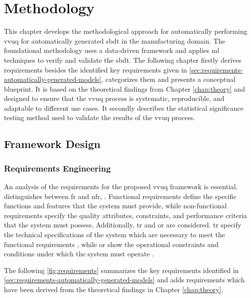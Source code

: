 \chapter{Methodology}
\label{chap:methodology}
This chapter develops the methodological approach for automatically performing \gls{vvuq} for automatically generated \gls{sbdt} in the manufacturing domain. The foundational methodology uses a data-driven framework and applies \gls{ml} techniques to verify and validate the \gls{sbdt}. The following chapter firstly derives requirements besides the identified key requirements given in \autoref{sec:requirements-automatically-generated-models}, categorizes them and presents a conceptual blueprint. It is based on the theoretical findings from Chapter \ref{chap:theory} and designed to ensure that the \gls{vvuq} process is systematic, reproducible, and adaptable to different use cases. It secondly describes the statistical significance testing method used to validate the results of the \gls{vvuq} process.

\section{Framework Design}
\subsection{Requirements Engineering}
An analysis of the requirements for the proposed \gls{vvuq} framework is essential. \Textcite{sindhgatta2005functional} distinguishes between \gls{fr} \textcite{van2001goal} and \gls{nfr}, \textcite{glinz2005rethinking}. Functional requirements define the specific functions and features that the system must provide, while non-functional requirements specify the quality attributes, constraints, and performance criteria that the system must possess. Additionally, \gls{tr} and \gls{or} are considered. \gls{tr} specify the technical specifications of the system which are necessary to meet the functional requirements \autocite{chikh2012new}, while \gls{or} show the operational constraints and conditions under which the system must operate \autocite{incose2023incose}.

The following \autoref{fig:requirements} summarizes the key requirements identified in \autoref{sec:requirements-automatically-generated-models} and adds requirements which have been derived from the theoretical findings in Chapter \ref{chap:theory}.

